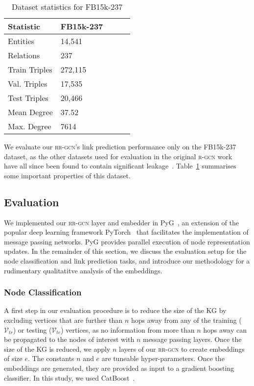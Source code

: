 \documentclass{llncs}
\begin{document}
\begin{table}[h!]
\begin{center}
 
\begin{tabular}{lllll}\toprule
     \textbf{Statistic}      & \textbf{FB15k-237}\\\midrule
Entities  &  14,541 \\
Relations  & 237 \\
Train Triples  & 272,115  \\
Val. Triples  & 17,535  \\
Test Triples  & 20,466 \\
Mean Degree &  37.52 \\
Max. Degree & 7614 \\ \bottomrule
\end{tabular}
\end{center}
\caption{Dataset statistics for FB15k-237\label{table:statistics3}}
\end{table}

We evaluate our \textsc{rr-gcn}'s link prediction performance only on the FB15k-237 dataset, as the other datasets used for evaluation in the original \textsc{r-gcn} work~\cite{schlichtkrull2018modeling} have all since been found to contain significant leakage~\cite{dettmers2018convolutional}. Table~\ref{table:statistics3} summarises some important properties of this dataset.

\subsection{Evaluation} \label{sec:setup}
We implemented our \textsc{rr-gcn} layer and embedder in PyG~\cite{NEURIPS2019_9015}, an extension of the popular deep learning framework PyTorch~\cite{Fey/Lenssen/2019} that facilitates the implementation of message passing networks. PyG provides parallel execution of node representation updates. In the remainder of this section, we discuss the evaluation setup for the node classification and link prediction tasks, and introduce our methodology for a rudimentary qualitatitve analysis of the embeddings.

\subsubsection{Node Classification}
A first step in our evaluation procedure is to reduce the size of the KG by excluding vertices that are further than $n$ hops away from any of the training ($\mathcal{V}_{tr}$) or testing ($\mathcal{V}_{te}$) vertices, as no information from more than $n$ hops away can be propagated to the nodes of interest with $n$ message passing layers. Once the size of the KG is reduced, we apply $n$ layers of our \textsc{rr-gcn} to create embeddings of size $e$. The constants $n$ and $e$ are tuneable hyper-parameters. Once the embeddings are generated, they are provided as input to a gradient boosting classifier. In this study, we used CatBoost~\cite{dorogush2018catboost}.
\end{document}
